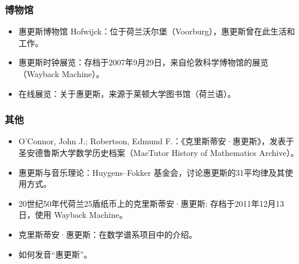 \subsubsection{博物馆}
\begin{itemize}
\item 惠更斯博物馆 Hofwijck：位于荷兰沃尔堡（Voorburg），惠更斯曾在此生活和工作。
\item 惠更斯时钟展览：存档于2007年9月29日，来自伦敦科学博物馆的展览（Wayback Machine）。
\item 在线展览：关于惠更斯，来源于莱顿大学图书馆（荷兰语）。
\end{itemize}
\subsubsection{其他}
\begin{itemize}
\item O'Connor, John J.; Robertson, Edmund F.：《克里斯蒂安·惠更斯》，发表于圣安德鲁斯大学数学历史档案（MacTutor History of Mathematics Archive）。
\item 惠更斯与音乐理论：Huygens–Fokker 基金会，讨论惠更斯的31平均律及其使用方式。
\item 20世纪50年代荷兰25盾纸币上的克里斯蒂安·惠更斯: 存档于2011年12月13日，使用 Wayback Machine。
\item 克里斯蒂安·惠更斯：在数学谱系项目中的介绍。
\item 如何发音“惠更斯”。
\end{itemize}